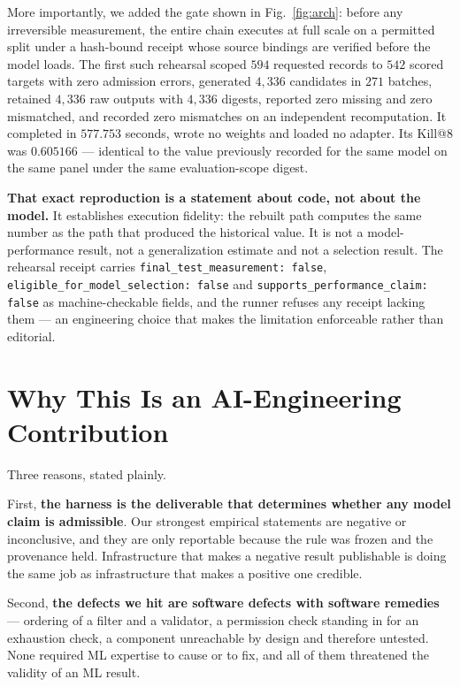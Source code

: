 \documentclass[10pt,conference]{IEEEtran}
\makeatletter
\newcommand{\killk}[1]{Kill@#1}
\makeatother
\begin{document}
More importantly, we added the gate shown in Fig.~\ref{fig:arch}: before any
irreversible measurement, the entire chain executes at full scale on a permitted
split under a hash-bound receipt whose source bindings are verified before the
model loads. The first such rehearsal scoped $594$ requested records to $542$
scored targets with zero admission errors, generated $4{,}336$ candidates in
$271$ batches, retained $4{,}336$ raw outputs with $4{,}336$ digests, reported
zero missing and zero mismatched, and recorded zero mismatches on an independent
recomputation. It completed in $577.753$ seconds, wrote no weights and loaded no
adapter. Its \killk{8} was $0.605166$ --- identical to the value previously
recorded for the same model on the same panel under the same evaluation-scope
digest.

\textbf{That exact reproduction is a statement about code, not about the
model.} It establishes execution fidelity: the rebuilt path computes the same
number as the path that produced the historical value. It is not a
model-performance result, not a generalization estimate and not a selection
result. The rehearsal receipt carries
\texttt{final\_test\_measurement: false},
\texttt{eligible\_for\_model\_selection: false} and
\texttt{supports\_performance\_claim: false} as machine-checkable fields, and
the runner refuses any receipt lacking them --- an engineering choice that makes
the limitation enforceable rather than editorial.

\section{Why This Is an AI-Engineering Contribution}

Three reasons, stated plainly.

First, \textbf{the harness is the deliverable that determines whether any model
claim is admissible}. Our strongest empirical statements are negative or
inconclusive, and they are only reportable because the rule was frozen and the
provenance held. Infrastructure that makes a negative result publishable is
doing the same job as infrastructure that makes a positive one credible.

Second, \textbf{the defects we hit are software defects with software
remedies} --- ordering of a filter and a validator, a permission check standing
in for an exhaustion check, a component unreachable by design and therefore
untested. None required ML expertise to cause or to fix, and all of them
threatened the validity of an ML result.
\end{document}
